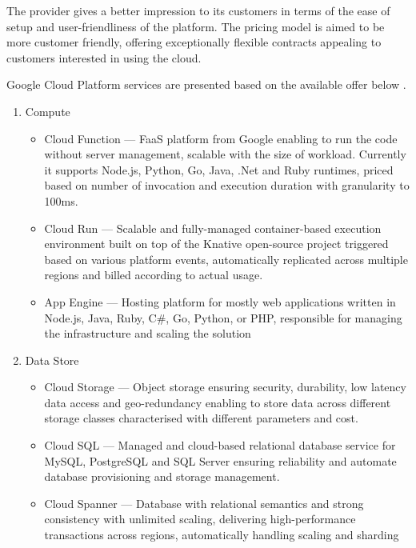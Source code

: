 The provider gives a better impression to its customers in terms of the ease of setup and user-friendliness of the platform. The pricing model is aimed to be more customer friendly, offering exceptionally flexible contracts appealing to customers interested in using the cloud.

Google Cloud Platform services are presented based on the available offer below \cite{GCPServerlessOffering}.


\begin{enumerate}
   \item Compute
   \begin{itemize}
       \item Cloud Function --- FaaS platform from Google enabling to run the code without server management, scalable with the size of workload. Currently it supports Node.js, Python, Go, Java, .Net and Ruby runtimes, priced based on number of invocation and execution duration with granularity to 100ms.
       \item Cloud Run --- Scalable and fully-managed container-based execution environment built on top of the Knative open-source project triggered based on various platform events, automatically replicated across multiple regions and billed according to actual usage.
       \item App Engine --- Hosting platform for mostly web applications written in Node.js, Java, Ruby, C\#, Go, Python, or PHP, responsible for managing the infrastructure and scaling the solution
   \end{itemize}
   \item Data Store
   \begin{itemize}
       \item Cloud Storage --- Object storage ensuring security, durability, low latency data access and geo-redundancy enabling to store data across different storage classes characterised with different parameters and cost.
       \item Cloud SQL --- Managed and cloud-based relational database service for MySQL, PostgreSQL and SQL Server ensuring reliability and automate database provisioning and storage management.
       \item Cloud Spanner --- Database with relational semantics and strong consistency with unlimited scaling, delivering high-performance transactions across regions, automatically handling scaling and sharding

\end{itemize}
\end{enumerate}
